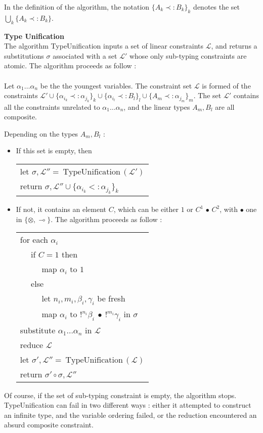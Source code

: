 In the definition of the algorithm, the notation $\{ A_k \prec: B_k \}_k$ denotes the set $\bigcup_{k} \{ A_k \prec: B_k \}$.

\begin{defn}{\bf Type Unification} \\
	The algorithm TypeUnification inputs a set of linear constraints $\mathcal{L}$, and returns
	a substitutions $\sigma$ associated with a set $\mathcal{L'}$ whose only sub-typing constraints are atomic.
	The algorithm proceeds as follow : \\
	\\
  Let $\alpha_1 \dots \alpha_n$ be the the youngest variables. The constraint set $\mathcal{L}$ is formed of the constraints
  $\mathcal{L'} \cup \{ \alpha_{i_k} \prec: \alpha_{j_k} \}_k \cup \{ \alpha_{i_l} \prec: B_l \}_l
	\cup \{ A_m \prec: \alpha_{j_m} \}_m$.
  The set $\mathcal{L'}$ contains all the constraints unrelated to $\alpha_1 \dots \alpha_n$,
  and the linear types $A_m, B_l$ are all composite.
  		
  Depending on the types $A_m, B_l$ :
	\begin{itemize}
		\item If this set is empty, then \\
			\begin{tabular}{l}
				let $\sigma, \mathcal{L''} = ~\text{TypeUnification}\,(\mathcal{L'})$ \\
				return $\sigma, \mathcal{L''} \cup \{ \alpha_{i_k} <: \alpha_{j_k} \}_k$
			\end{tabular}
	  
	  \item If not, it contains an element $C$, which can be either $1$ or $C^1 \,\bullet \, C^2$, with $\bullet$ one in $\{ \otimes, \multimap \}$.
		  The algorithm proceeds as follow :\\
	  	\begin{tabular}{l}
	  		for each $\alpha_i$ \\
	  		~~ if $C = 1$ then \\
	  		~~ ~~ map $\alpha_i$ to $1$ \\
	  		~~ else \\
	  		~~ ~~ let $n_i, m_i, \beta_i, \gamma_i$ be fresh \\
	  		~~ ~~ map $\alpha_i$ to $!^{n_i} \beta_i ~\bullet~ !^{m_i}\gamma_i$ in $\sigma$ \\
	  		substitute $\alpha_1 \dots \alpha_n$ in $\mathcal{L}$ \\
	  		reduce $\mathcal{L}$ \\
	  		let $\sigma', \mathcal{L''} = ~\text{TypeUnification}\,(\mathcal{L})$ \\
	  		return $\sigma' \circ \sigma, \mathcal{L''}$
	  	\end{tabular}
  \end{itemize}

  Of course, if the set of sub-typing constraint is empty, the algorithm stops.
  TypeUnification can fail in two different ways : either it attempted to construct an infinite
  type, and the variable ordering failed, or the reduction encountered an absurd composite constraint.
\end{defn}

